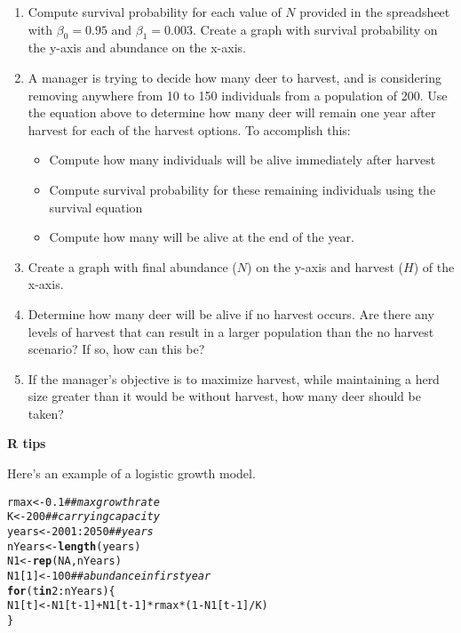 \documentclass[12pt]{article}\usepackage[]{graphicx}\usepackage[]{xcolor}
\makeatletter
\newcommand{\hlnum}[1]{\textcolor[rgb]{0.686,0.059,0.569}{#1}}%
\newcommand{\hlcom}[1]{\textcolor[rgb]{0.678,0.584,0.686}{\textit{#1}}}%
\newcommand{\hlopt}[1]{\textcolor[rgb]{0,0,0}{#1}}%
\newcommand{\hldef}[1]{\textcolor[rgb]{0.345,0.345,0.345}{#1}}%
\newcommand{\hlkwa}[1]{\textcolor[rgb]{0.161,0.373,0.58}{\textbf{#1}}}%
\newcommand{\hlkwb}[1]{\textcolor[rgb]{0.69,0.353,0.396}{#1}}%
\newcommand{\hlkwd}[1]{\textcolor[rgb]{0.737,0.353,0.396}{\textbf{#1}}}%
\newenvironment{kframe}{%
 \def\at@end@of@kframe{}%
 \ifinner\ifhmode%
  \def\at@end@of@kframe{\end{minipage}}%
  \begin{minipage}{\columnwidth}%
 \fi\fi%
 \def\FrameCommand##1{\hskip\@totalleftmargin \hskip-\fboxsep
 \colorbox{shadecolor}{##1}\hskip-\fboxsep
     \hskip-\linewidth \hskip-\@totalleftmargin \hskip\columnwidth}%
 \MakeFramed {\advance\hsize-\width
   \@totalleftmargin\z@ \linewidth\hsize
   \@setminipage}}%
 {\par\unskip\endMakeFramed%
 \at@end@of@kframe}
\newenvironment{knitrout}{}{} %
\makeatother
\begin{document}
\begin{enumerate}
  \item Compute survival probability for each value of $N$ provided in
    the spreadsheet with $\beta_0=0.95$ and $\beta_1=0.003$. Create a
    graph with survival probability on the y-axis and abundance on the
    x-axis.
  \item A manager is trying to decide how many deer to harvest, and is
    considering removing anywhere from 10 to 150 individuals from a
    population of 200. Use the equation above to determine how many
    deer will remain one year after harvest for each of the harvest
    options. To accomplish this:
  \begin{itemize}
    \item Compute how many individuals will be alive immediately after
      harvest
    \item Compute survival probability for these remaining individuals
      using the survival equation
    \item Compute how many will be alive at the end of the year.
  \end{itemize}
  \item Create a graph with final abundance ($N$) on the y-axis and
    harvest ($H$) of the x-axis. %
  \item Determine how many deer will be alive if no harvest
    occurs. Are there any levels of harvest that can result in a
    larger population than the no harvest scenario? If so, how can
    this be?
  \item If the manager's objective is to maximize harvest, while
    maintaining a herd size greater than it would be without harvest,
    how many deer should be taken?
\end{enumerate}


\newpage

{\bf R tips \\}


Here's an example of a logistic growth model.
\begin{knitrout}\small
{}\color{fgcolor}\begin{kframe}
\begin{alltt}
\hldef{rmax} \hlkwb{<-} \hlnum{0.1}              \hlcom{## max growth rate}
\hldef{K} \hlkwb{<-} \hlnum{200}                 \hlcom{## carrying capacity}
\hldef{years} \hlkwb{<-} \hlnum{2001}\hlopt{:}\hlnum{2050}       \hlcom{## years}
\hldef{nYears} \hlkwb{<-} \hlkwd{length}\hldef{(years)}
\hldef{N1} \hlkwb{<-} \hlkwd{rep}\hldef{(}\hlnum{NA}\hldef{, nYears)}
\hldef{N1[}\hlnum{1}\hldef{]} \hlkwb{<-} \hlnum{100}             \hlcom{## abundance in first year}
\hlkwa{for}\hldef{(t} \hlkwa{in} \hlnum{2}\hlopt{:}\hldef{nYears) \{}
    \hldef{N1[t]} \hlkwb{<-} \hldef{N1[t}\hlopt{-}\hlnum{1}\hldef{]} \hlopt{+} \hldef{N1[t}\hlopt{-}\hlnum{1}\hldef{]}\hlopt{*}\hldef{rmax}\hlopt{*}\hldef{(}\hlnum{1} \hlopt{-} \hldef{N1[t}\hlopt{-}\hlnum{1}\hldef{]}\hlopt{/}\hldef{K)}
\hldef{\}}
\end{alltt}
\end{kframe}
\end{knitrout}
\end{document}
